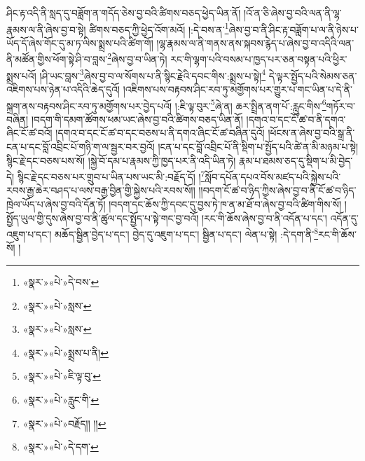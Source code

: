 ཤིང་རྟ་འདི་ནི་སླད་དུ་བཟློག་ན་གདོད་ཅེས་བྱ་བའི་ཚིགས་བཅད་ཕྱེད་ཡིན་ནོ། །འོ་ན་ཅི་ཞེས་བྱ་བའི་ལན་ནི་ལྷ་རྣམས་ལ་ནི་ཞེས་བྱ་བ་སྟེ། ཚིགས་བཅད་ཀྱི་ཕྱེད་འོག་མའོ། །:དེ་བས་ན་\footnote{«སྣར་»«པེ་»དེ་བས་}ཞེས་བྱ་བ་ནི་ཤིང་རྟ་བཟློག་པ་ལ་ནི་ཉེས་པ་ཡོད་དོ་ཞེས་གོང་དུ་མ་ཏ་ལིས་སྨྲས་པའི་ཚིག་གོ། །ལྷ་རྣམས་ལ་ནི་གནས་ནས་སྐབས་རྙེད་པ་ཞེས་བྱ་བ་འདིའི་ལན་ནི་མཚོན་གྱིས་ཕོག་སྟེ་ཤི་བ་བླས་\footnote{«སྣར་»«པེ་»སླས་}ཞེས་བྱ་བ་ཡིན་ཏེ། རང་གི་ལྷག་པའི་བསམ་པ་ཁྱད་པར་ཅན་བསྟན་པའི་ཕྱིར་སྨྲས་པའོ། །ཤི་ཡང་བླས་\footnote{«སྣར་»«པེ་»སླས་}ཞེས་བྱ་བ་ལ་སོགས་པ་ནི་སྙིང་རྗེའི་དབང་གིས་:སྨྲས་པ་སྟེ།\footnote{«སྣར་»«པེ་»སྨྲས་པ་ནི།} དེ་ལྟར་སྤྱོད་པའི་སེམས་ཅན་འཇིགས་པས་ཉེན་པ་འདིའི་ཆེད་དུའོ། །འཇིགས་པས་བརྟབས་ཤིང་རབ་ཏུ་མགྱོགས་པར་གྱུར་པ་གང་ཡིན་པ་དེ་ནི་སྐྲག་ནས་བརྟབས་ཤིང་རབ་ཏུ་མགྱོགས་པར་བྱེད་པའོ། །:ཇི་ལྟ་བུར་\footnote{«སྣར་»«པེ་»ཇི་ལྟ་བུ་}ཞེ་ན། ཆར་སྤྲིན་ནག་པོ་:རླུང་གིས་\footnote{«སྣར་»«པེ་»རླུང་གི་}གཏོར་བ་བཞིན། །བདག་གི་དམག་ཚོགས་ཕམ་ཡང་ཞེས་བྱ་བའི་ཚིགས་བཅད་ཡིན་ནོ། །དགའ་བ་དང་ངོ་ཚ་བ་ནི་དགའ་ཞིང་ངོ་ཚ་བའོ། །དགའ་བ་དང་ངོ་ཚ་བ་དང་བཅས་པ་ནི་དགའ་ཞིང་ངོ་ཚ་བཞིན་དུའོ། །ཕོངས་ན་ཞེས་བྱ་བའི་སྒྲ་ནི་ངན་པ་དང་བློ་འབྲིང་པོ་གཉི་ག་ལ་སྦྱར་བར་བྱའོ། །ངན་པ་དང་བློ་འབྲིང་པོ་ནི་སྡིག་པ་སྤྱོད་པའི་ཚེ་ན་མི་མཉམ་པ་སྟེ། སྙིང་རྗེ་དང་བཅས་པས་སོ། །སྐྱེ་བོ་དམ་པ་རྣམས་ཀྱི་ཁྱད་པར་ནི་འདི་ཡིན་ཏེ། རྣམ་པ་ཐམས་ཅད་དུ་སྡིག་པ་མི་བྱེད་དེ། སྙིང་རྗེ་དང་བཅས་པར་གྲུབ་པ་ཡིན་པས་ཡང་མི་:བརྗོད་དོ། །\footnote{«སྣར་»«པེ་»བརྗོད།། །།}སློབ་དཔོན་དཔའ་བོས་མཛད་པའི་སྐྱེས་པའི་རབས་རྒྱ་ཆེར་བཤད་པ་ལས་བརྒྱ་བྱིན་གྱི་སྐྱེས་པའི་རབས་སོ།། །།བདག་ངོ་ཚ་བ་ཉིད་ཀྱིས་ཞེས་བྱ་བ་ནི་ངོ་ཚ་བ་ཉིད་ཁྲེལ་ཡོད་པ་ཞེས་བྱ་བའི་དོན་ཏོ། །བདག་དང་ཆོས་ཀྱི་དབང་དུ་བྱས་ཏེ་ཁ་ན་མ་ཐོ་བ་ཞེས་བྱ་བའི་ཚིག་གིས་སོ། །སྤྱོད་ཡུལ་གྱི་དུས་ཞེས་བྱ་བ་ནི་ཚུལ་དང་སྤྱོད་པ་སྟེ་གང་བྱ་བའོ། །རང་གི་ཆོས་ཞེས་བྱ་བ་ནི་འདོན་པ་དང་། འདོན་དུ་འཇུག་པ་དང་། མཆོད་སྦྱིན་བྱེད་པ་དང་། བྱེད་དུ་འཇུག་པ་དང་། སྦྱིན་པ་དང་། ལེན་པ་སྟེ། :དེ་དག་ནི་\footnote{«སྣར་»«པེ་»དེ་དག་}རང་གི་ཆོས་སོ། །
